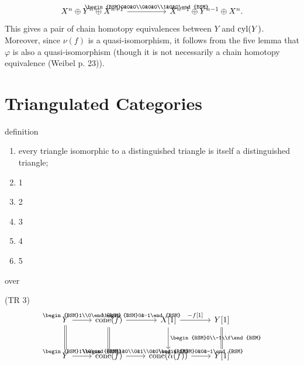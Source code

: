 \begin{equation*}
  \begin{tikzcd}[ampersand replacement=\&,column sep=huge,]
    X^{n}\oplus Y^{n}\oplus X^{n+1} \& X^{n-1}\oplus Y^{n-1}\oplus X^{n}.
    \arrow[from=1-1,]{1-2}[]{\begin{BSM}0&0&0\\0&0&0\\1&0&0\end{BSM}}
  \end{tikzcd}
\end{equation*}
This gives a pair of chain homotopy equivalences between $Y$ and $\operatorname{cyl}(Y)$. Moreover, since $\nu(f)$ is a quasi-isomorphism, it follows from the five lemma that $\varphi$ is also a quasi-isomorphism (though it is not necessarily a chain homotopy equivalence (Weibel p. 23)).

\section{Triangulated Categories}

definition
\begin{enumerate}[label={(TR \arabic*)},start=0,labelindent=!,]
  \item every triangle isomorphic to a distinguished triangle is itself a distinguished triangle;
  \item 1
  \item 2
  \item 3
  \item 4
  \item 5
\end{enumerate}
over

(TR 3)
\begin{equation*}
  \begin{tikzcd}[ampersand replacement=\&,row sep=large]
    Y \& \CONE(f) \& X[1] \& Y[1]\\
    Y \& \CONE(f) \& \CONE(\alpha(f)) \& Y[1]
    \arrow[from=1-1,]{1-2}[]{\begin{BSM}1\\0\end{BSM}}
    \arrow[from=1-2,]{1-3}[]{\begin{BSM}0&-1\end{BSM}}
    \arrow[from=1-3,]{1-4}[]{-f[1]}
    \arrow[from=2-1,]{2-2}[]{\begin{BSM}1\\0\end{BSM}}
    \arrow[from=2-2,]{2-3}[]{\begin{BSM}1&0\\0&1\\0&0\end{BSM}}
    \arrow[from=2-3,]{2-4}[]{\begin{BSM}0&0&-1\end{BSM}}
    \arrow[from=1-1,equal]{2-1}[]{}
    \arrow[from=1-2,equal]{2-2}[]{}
    \arrow[from=1-3,]{2-3}[]{\begin{BSM}0\\-1\\f\end{BSM}}
    \arrow[from=1-4,equal]{2-4}[]{}
  \end{tikzcd}
\end{equation*}

